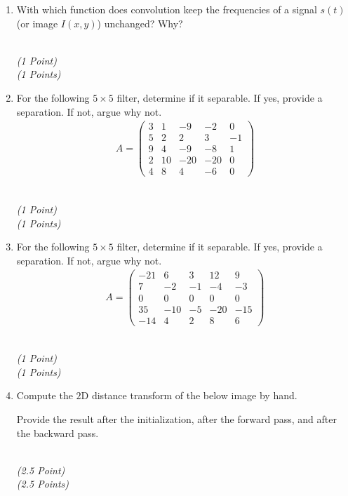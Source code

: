 \documentclass[11pt]{article}
\newcommand{\points}[1]{
    \ifthenelse{\equal{#1}{1}}
        {\\ \emph{(#1 Point)}}
        {\\ \emph{(#1 Points)}}
}
\begin{document}
\begin{enumerate}
\begin{enumerate}
        \points{1.5}
        \item With which function does convolution keep the frequencies of a signal $ s(t) $ (or image $ I(x,y) $) unchanged? Why?
        \points{1}
        \item For the following $ 5 \times 5 $ filter, determine if it separable. If yes, provide a separation. If not, argue why not.
              \begin{align*}
                  A = \begin{pmatrix}
                         3 & 1 & -9 & -2 & 0 \\
                         5 & 2 & 2 & 3 & -1 \\
                         9 & 4 & -9 & -8 & 1 \\
                         2 & 10 & -20 & -20 & 0 \\
                         4 & 8 & 4 & -6 & 0
                      \end{pmatrix}
              \end{align*}
        \points{1}
        \item For the following $ 5 \times 5 $ filter, determine if it separable. If yes, provide a separation. If not, argue why not.
              \begin{align*}
	              A = \begin{pmatrix}
	                -21 & 6 & 3 & 12 & 9 \\
	                7 & -2 & -1 & -4 & -3 \\
	                0 & 0 & 0 & 0 & 0 \\
	                35 & -10 & -5 & -20 & -15 \\
	                -14 & 4 & 2 & 8 & 6
                  \end{pmatrix}
          \end{align*}
        \points{1}
        \item Compute the $ 2 $D distance transform of the below image by hand.\\
              \begin{center}
              \end{center}
              Provide the result after the initialization, after the forward pass, and after the backward pass.
        \points{2.5}
    \end{enumerate}


\end{enumerate}
\end{document}
